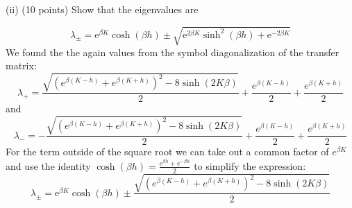 \documentclass[12pt]{article}
\begin{document}
\subsection{}

(ii) (10 points) Show that the eigenvalues are


\begin{equation*}
\lambda_{ \pm}=\mathrm{e}^{\beta K} \cosh (\beta h) \pm \sqrt{\mathrm{e}^{2 \beta K} \sinh ^{2}(\beta h)+\mathrm{e}^{-2 \beta K}} \tag{6}
\end{equation*}
We found the the again values from the symbol diagonalization of the transfer matrix:
\begin{equation}
  \lambda_{+} = \frac{\sqrt{\left(e^{\beta(K - h)} + e^{\beta(K + h)}\right)^2 - 8\sinh(2K\beta)}}{2} + \frac{e^{\beta(K - h)}}{2} + \frac{e^{\beta(K + h)}}{2}
\end{equation}
and
\begin{equation}
  \lambda_{-} = -\frac{\sqrt{\left(e^{\beta(K - h)} + e^{\beta(K + h)}\right)^2 - 8\sinh(2K\beta)}}{2} + \frac{e^{\beta(K - h)}}{2} + \frac{e^{\beta(K + h)}}{2}
\end{equation}
For the term outside of the square root we can take out a common factor of $e^{\beta K}$ and use the identity $\cosh(\beta h) = \frac{e^{\beta h} + e^{-\beta h}}{2}$ to simplify the expression:
\begin{equation}
\lambda_{ \pm}=\mathrm{e}^{\beta K} \cosh (\beta h) \pm \frac{\sqrt{\left(e^{\beta(K - h)} + e^{\beta(K + h)}\right)^2 - 8\sinh(2K\beta)}}{2}
\end{equation}
\end{document}
